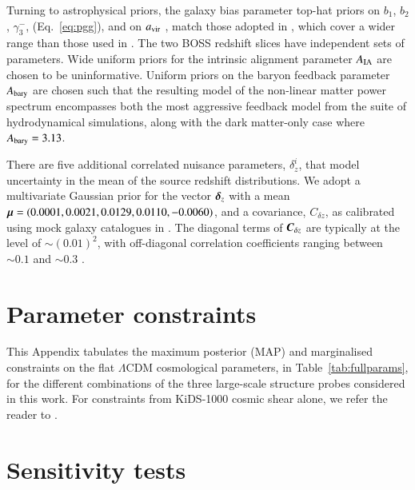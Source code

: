 \begin{appendix}
Turning to astrophysical priors, the galaxy bias parameter top-hat priors on $b_1$, $b_2$,  $\gamma_3^-$, (Eq.~\ref{eq:pgg}), and on $a_{\rm vir}$ \citep[see the `fingers of god' model in equations 6 to 9 of][]{joachimi/etal:inprep},
match those adopted in \citet{troester/etal:2020}, which cover a wider range than those used in \citet{sanchez/etal:2017}.  
The two BOSS redshift slices have independent sets of parameters.   
Wide uniform priors for the intrinsic alignment parameter $A_{\rm IA}$ are chosen to be uninformative.    
Uniform priors on the baryon feedback parameter $A_{\rm bary}$ are chosen such that the resulting \citet{mead/etal:2015} model of the non-linear matter power spectrum encompasses both the most aggressive feedback model from the \citet{vandaalen/etal:2011} suite of hydrodynamical simulations, along with the dark matter-only case where $A_{\rm bary}=3.13$.

There are five additional correlated nuisance parameters, $\delta^i_z$, that model uncertainty in the mean of the source redshift distributions.  We adopt a multivariate Gaussian prior for the vector $\mbox{\boldmath $\delta$}_z$ with a mean $\mbox{\boldmath $\mu$} = (0.0001,0.0021,0.0129,0.0110,-0.0060)$, and a covariance, $C_{\delta z}$, as calibrated using mock galaxy catalogues in \citet{wright/etal:2020}.   
The diagonal terms of $\mbox{\boldmath $C$}_{\delta z}$ are typically at the level of $\sim\!(0.01)^2$, with off-diagonal correlation coefficients ranging between $\sim\! 0.1$ and $\sim\! 0.3$ \citep[see section 3 and figure 2 of][for details]{hildebrandt/etal:inprep}.


\section{Parameter constraints}
\label{app:parameter-constraints}
This Appendix tabulates the maximum posterior (MAP) and marginalised constraints on the flat $\Lambda$CDM cosmological parameters, in Table~\ref{tab:fullparams}, for the different combinations of the three large-scale structure probes considered in this work.   For constraints from KiDS-1000 cosmic shear alone, we refer the reader to \citet{asgari/etal:inprep}.


\section{Sensitivity tests}
\label{app:sensitivity}


\end{appendix}
